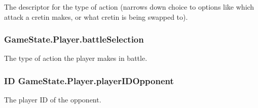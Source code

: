 The descriptor for the type of action (narrows down choice to options like which attack a cretin makes, or what cretin is being swapped to). 

\hypertarget{struct_game_state_1_1_player_a123c8ee2ef6e66e88bcca1a80f73ab4a}{
\subsubsection[{battle\-Selection}]{ Game\-State.\-Player.\-battle\-Selection}}\label{struct_game_state_1_1_player_a123c8ee2ef6e66e88bcca1a80f73ab4a}


The type of action the player makes in battle. 

\hypertarget{struct_game_state_1_1_player_aaed188c94b7f6be4dabe39744aa818ca}{
\subsubsection[{player\-I\-D\-Opponent}]{\setlength{\rightskip}{0pt plus 5cm}I\-D Game\-State.\-Player.\-player\-I\-D\-Opponent}}\label{struct_game_state_1_1_player_aaed188c94b7f6be4dabe39744aa818ca}


The player I\-D of the opponent. 

